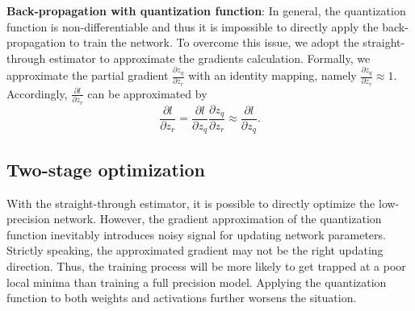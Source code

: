 \documentclass[10pt,twocolumn,letterpaper]{article}
\begin{document}
\noindent \textbf{Back-propagation with quantization function}: In general, the quantization function is non-differentiable and thus it is impossible to directly apply the back-propagation to train the network. To overcome this issue, we adopt the straight-through estimator \cite{zhou2016dorefa, hubara2016binarized, bengio2013estimating} to approximate the gradients calculation. Formally, we approximate the partial gradient $\frac{{\partial {z_q}}}{{\partial {z_r}}}$ with an identity mapping, namely $\frac{{\partial {z_q}}}{{\partial {z_r}}} \approx 1$.  Accordingly, $\frac{{\partial l}}{{\partial {z_r}}}$ can be approximated by
\begin{equation}
	\frac{{\partial l}}{{\partial {z_r}}} = \frac{{\partial l}}{{\partial {z_q}}}\frac{{\partial {z_q}}}{{\partial {z_r}}} \approx \frac{{\partial l}}{{\partial {z_q}}}.
\end{equation}


%
%
%
%
%
%
%
\subsection{Two-stage optimization}\label{sec:two-stage}
With the straight-through estimator, it is possible to directly optimize the low-precision network. However, the gradient approximation of the quantization function inevitably introduces noisy signal for updating network parameters. Strictly speaking, the approximated gradient may not be the right updating direction. Thus, the training process will be more likely to get trapped at a poor local minima than training a full precision model. Applying the quantization function to both weights and activations further worsens the situation.
\end{document}

